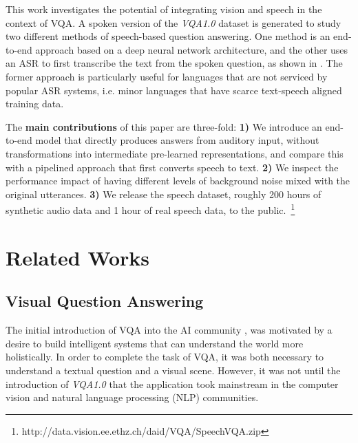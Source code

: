 \documentclass[letterpaper]{article} %
\newcommand{\tz}[1]{\textcolor{purple}{\textit{#1}}}
\begin{document}
This work investigates the potential of integrating vision and speech in the context of VQA. A spoken version of the \textit{VQA1.0} dataset is generated to study two different methods of speech-based question answering. One method is an end-to-end approach based on a deep neural network architecture, and the other uses an ASR to first transcribe the text from the spoken question, as shown in . The former approach is particularly useful for languages that are not serviced by popular ASR systems, i.e. minor languages that have scarce text-speech aligned training data.

The \textbf{main contributions} of this paper are three-fold: \textbf{1)} We introduce an end-to-end model that directly produces answers from auditory input, without transformations into intermediate pre-learned representations, and compare this with a pipelined approach that first converts speech to text. \textbf{2)} We inspect the performance impact of having different levels of background noise mixed with the original utterances. \textbf{3)} We release the speech dataset, roughly 200 hours of synthetic audio data and 1 hour of real speech data, to the public.~\footnote{http://data.vision.ee.ethz.ch/daid/VQA/SpeechVQA.zip}


\section{Related Works}

\subsection{Visual Question Answering}
The initial introduction of VQA into the AI community \cite{realtime:vqa}, \cite{daquar} was motivated by a desire to build intelligent systems that can understand the world more holistically. In order to complete the task of VQA, it was both necessary to understand a textual question and a visual scene. However, it was not until the introduction of \textit{VQA1.0} \cite{VQA} that the application took mainstream in the computer vision and natural language processing (NLP) communities.
\end{document}
